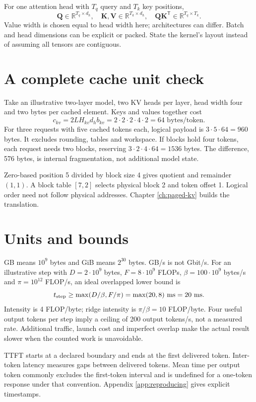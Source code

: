 For one attention head with $T_q$ query and $T_k$ key positions,
\[
 \mathbf{Q}\in\mathbb{R}^{T_q\times d_h},\quad
 \mathbf{K},\mathbf{V}\in\mathbb{R}^{T_k\times d_h},\quad
 \mathbf{QK}^{\mathsf T}\in\mathbb{R}^{T_q\times T_k}.
\]
Value width is chosen equal to head width here; architectures can differ.
Batch and head dimensions can be explicit or packed. State the kernel's
layout instead of assuming all tensors are contiguous.

\section{A complete cache unit check}
Take an illustrative two-layer model, two KV heads per layer, head width
four and two bytes per cached element. Keys and values together cost
\[
 c_{kv}=2LH_{kv}d_hb_{kv}
       =2\cdot2\cdot2\cdot4\cdot2=64\text{ bytes/token}.
\]
For three requests with five cached tokens each, logical payload is
$3\cdot5\cdot64=960$ bytes. It excludes rounding, tables and workspace.
If blocks hold four tokens, each request needs two blocks, reserving
$3\cdot2\cdot4\cdot64=1536$ bytes. The difference, 576 bytes, is internal
fragmentation, not additional model state.

Zero-based position 5 divided by block size 4 gives quotient and remainder
$(1,1)$. A block table $[7,2]$ selects physical block 2 and token offset 1.
Logical order need not follow physical addresses. Chapter
\ref{ch:paged-kv} builds the translation.

\section{Units and bounds}
GB means $10^9$ bytes and GiB means $2^{30}$ bytes. GB/s is not Gbit/s.
For an illustrative step with $D=2\cdot10^9$ bytes,
$F=8\cdot10^9$ FLOPs, $\beta=100\cdot10^9$ bytes/s and
$\pi=10^{12}$ FLOP/s, an ideal overlapped lower bound is
\[
 t_{\rm step}\geq\max(D/\beta,F/\pi)
              =\max(20,8)\text{ ms}=20\text{ ms}.
\]
Intensity is 4 FLOP/byte; ridge intensity is $\pi/\beta=10$ FLOP/byte.
Four useful output tokens per step imply a ceiling of 200 output tokens/s,
not a measured rate. Additional traffic, launch cost and imperfect overlap
make the actual result slower when the counted work is unavoidable.

TTFT starts at a declared boundary and ends at the first delivered token.
Inter-token latency measures gaps between delivered tokens. Mean time per
output token commonly excludes the first-token interval and is undefined
for a one-token response under that convention. Appendix
\ref{app:reproducing} gives explicit timestamps.
